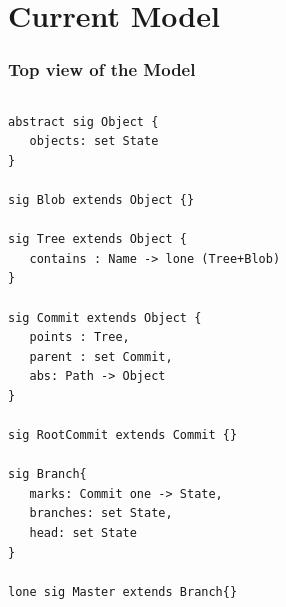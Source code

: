 \documentclass{beamer}
\begin{document}

\section{Current Model}
\begin{frame}[fragile]
   \frametitle{Top view of the Model}
   \tiny
   \begin{columns}[c]
      \column{1.5in}
         \begin{lstlisting}
abstract sig Object {
   objects: set State
}

sig Blob extends Object {}

sig Tree extends Object {
   contains : Name -> lone (Tree+Blob)
}

sig Commit extends Object {
   points : Tree,
   parent : set Commit,
   abs: Path -> Object
}

sig RootCommit extends Commit {}

sig Branch{
   marks: Commit one -> State,
   branches: set State,
   head: set State
}

lone sig Master extends Branch{}
                  
         \end{lstlisting}
      \column{1.5in}
   \end{columns}
\end{frame}
\end{document}
